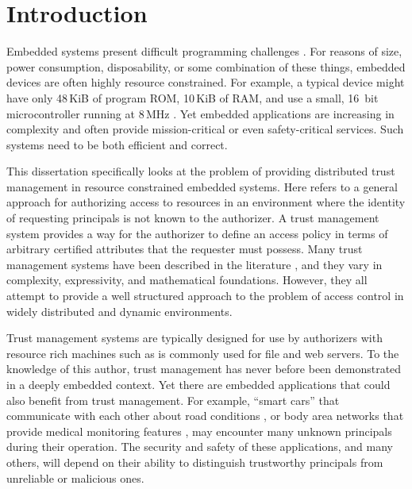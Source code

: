 \chapter{Introduction}
\label{chapter-introduction}

Embedded systems present difficult programming challenges
\cite{Mottola:2011:PWS:1922649.1922656}. For reasons of size, power consumption, disposability,
or some combination of these things, embedded devices are often highly resource constrained. For
example, a typical device might have only 48\,KiB of program ROM, 10\,KiB of RAM, and use a
small, 16~bit microcontroller running at 8\,MHz \cite{tmotesky-datasheet}. Yet embedded
applications are increasing in complexity and often provide mission-critical or even
safety-critical services. Such systems need to be both efficient and correct.

This dissertation specifically looks at the problem of providing distributed trust management in
resource constrained embedded systems. Here  refers to a general
approach for authorizing access to resources in an environment where the identity of requesting
principals is not known to the authorizer. A trust management system provides a way for the
authorizer to define an access policy in terms of arbitrary certified attributes that the
requester must possess. Many trust management systems have been described in the literature
\cite{chapin-skalka-wang-acmcs08}, and they vary in complexity, expressivity, and mathematical
foundations. However, they all attempt to provide a well structured approach to the problem of
access control in widely distributed and dynamic environments.

Trust management systems are typically designed for use by authorizers with resource rich
machines such as is commonly used for file and web servers. To the knowledge of this author,
trust management has never before been demonstrated in a deeply embedded context. Yet there are
embedded applications that could also benefit from trust management. For example, ``smart cars''
that communicate with each other about road conditions \cite{Seepold:2009:ESP:1641563.1641568},
or body area networks that provide medical monitoring features
\cite{Shnayder:2005:SNM:1098918.1098979,Chen:2011:BAN:1968858.1968873}, may encounter many
unknown principals during their operation. The security and safety of these applications, and
many others, will depend on their ability to distinguish trustworthy principals from unreliable
or malicious ones.

